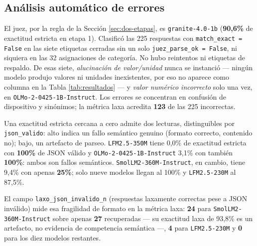 \subsection{Análisis automático de errores}
\label{sec:analisis-errores}

El juez, por la regla de la Sección \ref{sec:dos-etapas}, es
\texttt{granite-4.0-1b} (\textbf{90,6\%} de exactitud estricta en etapa 1).
Clasificó las 225 respuestas con \texttt{match\_exact = False} en las siete
etiquetas cerradas sin un solo \texttt{juez\_parse\_ok = False}, ni siquiera
en las 32 asignaciones de categoría. No hubo reintentos ni etiquetas de
respaldo. De
esas siete, \emph{alucinación de valor/unidad} nunca se instanció — ningún
modelo produjo valores ni unidades inexistentes, por eso no aparece como
columna en la Tabla \ref{tab:resultados} — y \emph{valor numérico incorrecto}
solo una vez, en \texttt{OLMo-2-0425-1B-Instruct}. Los errores se
concentran en confusión de dispositivo y sinónimos; la métrica laxa
acredita \textbf{123} de las 225 incorrectas.

Una exactitud estricta cercana a cero admite dos lecturas, distinguibles por
\texttt{json\_valido}: alto indica un fallo semántico genuino (formato
correcto, contenido no); bajo, un artefacto de parseo. \texttt{LFM2.5-350M}
tiene 0,0\% de exactitud estricta con \textbf{100\%} de JSON válido y
\texttt{OLMo-2-0425-1B-Instruct} 3,1\% con también \textbf{100\%}: ambos son
fallos semánticos. \texttt{SmolLM2-360M-Instruct}, en cambio, tiene 9,4\% con
apenas \textbf{25\%}; solo nueve modelos llegan al 100\% y
\texttt{LFM2.5-230M} al 87,5\%.

El campo \texttt{laxo\_json\_invalido\_n} (respuestas laxamente correctas
pese a JSON inválido) mide esa fragilidad de formato en la métrica laxa:
\textbf{24} para \texttt{SmolLM2-360M-Instruct} sobre apenas \textbf{27}
recuperadas — su exactitud laxa de 93,8\% es un artefacto, no evidencia de
competencia semántica —, \textbf{4} para \texttt{LFM2.5-230M} y \textbf{0}
para los diez modelos restantes.
